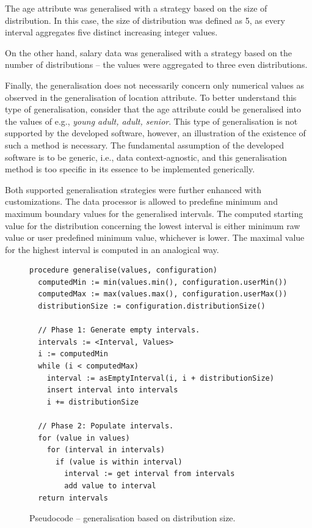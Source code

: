 \documentclass[a4paper,twoside,12pt]{book}
\begin{document}
The age attribute was generalised with a strategy based on the size of distribution. In this case, the size of distribution was defined as 5, as every interval aggregates five distinct increasing integer values.

On the other hand, salary data was generalised with a strategy based on the number of distributions – the values were aggregated to three even distributions.

Finally, the generalisation does not necessarily concern only numerical values as observed in the generalisation of location attribute. To better understand this type of generalisation, consider that the age attribute could be generalised into the values of e.g., \textit{young adult, adult, senior}. This type of generalisation is not supported by the developed software, however, an illustration of the existence of such a method is necessary. The fundamental assumption of the developed software is to be generic, i.e., data context-agnostic, and this generalisation method is too specific in its essence to be implemented generically.

Both supported generalisation strategies were further enhanced with customizations. The data processor is allowed to predefine minimum and maximum boundary values for the generalised intervals. The computed starting value for the distribution concerning the lowest interval is either minimum raw value or user predefined minimum value, whichever is lower. The maximal value for the highest interval is computed in an analogical way.

\begin{figure}[h]
\begin{verbatim}
procedure generalise(values, configuration)
  computedMin := min(values.min(), configuration.userMin())
  computedMax := max(values.max(), configuration.userMax())
  distributionSize := configuration.distributionSize()

  // Phase 1: Generate empty intervals.
  intervals := <Interval, Values>
  i := computedMin
  while (i < computedMax)
    interval := asEmptyInterval(i, i + distributionSize)
    insert interval into intervals
    i += distributionSize

  // Phase 2: Populate intervals.
  for (value in values)
    for (interval in intervals)
      if (value is within interval)
        interval := get interval from intervals
        add value to interval
  return intervals
\end{verbatim}
\caption{Pseudocode – generalisation based on distribution size.}
\label{fig:code:generalisation1}
\end{figure}
\end{document}
